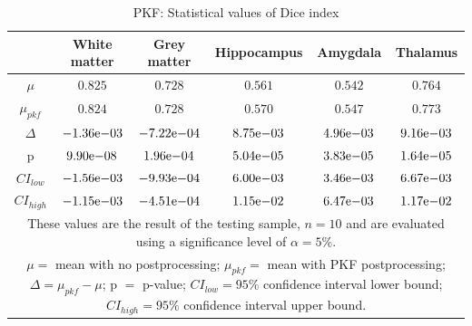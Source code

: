 \documentclass[journal]{IEEEtran}
\begin{document}
\begin{table}[ht]
\renewcommand{\arraystretch}{1.4}
\caption{PKF: Statistical values of Dice index}
\label{tbl_pkf_dice}
\centering
\begin{tabular}{c|c|c|c|c|c}
\hline
  & White matter & Grey matter & Hippocampus & Amygdala & Thalamus\\
\hline
$\mu$&$0.825$&$0.728$&$0.561$&$0.542$&$0.764$\\
$\mu_{pkf}$&$0.824$&$0.728$&$0.570$&$0.547$&$0.773$\\
$\Delta$&${-1.36}\mathrm{e}{-03}$&${-7.22}\mathrm{e}{-04}$&${8.75}\mathrm{e}{-03}$&${4.96}\mathrm{e}{-03}$&$9{.16}\mathrm{e}{-03}$\\
p&$	{9.90}\mathrm{e}{-08}$&${1.96}\mathrm{e}{-04}$&${5.04}\mathrm{e}{-05}$&$	{3.83}\mathrm{e}{-05}$&${1.64}\mathrm{e}{-05}$\\
$CI_{low}$&${-1.56}\mathrm{e}{-03}$&${-9.93}\mathrm{e}{-04}$&${6.00}\mathrm{e}{-03}$&$	{3.46}\mathrm{e}{-03}$&${6.67}\mathrm{e}{-03}$\\
$CI_{high}$&$	{-1.15}\mathrm{e}{-03}$&${-4.51}\mathrm{e}{-04}$&${1.15}\mathrm{e}{-02}$&$	{6.47}\mathrm{e}{-03}$&${1.17}\mathrm{e}{-02}$\\
\hline
\multicolumn{6}{p{\textwidth}}{These values are the result of the testing sample, $n=10$ and are evaluated using a significance level of $\alpha = 5\%$. }\\
\multicolumn{6}{p{\textwidth}}{$\mu=$ mean with no postprocessing; $\mu_{pkf}=$ mean with PKF postprocessing; $\Delta=\mu_{pkf}-\mu$; p $=$ p-value;  $CI_{low}= 95\%$ confidence interval lower bound; $CI_{high}= 95\%$ confidence interval upper bound.}\\

\end{tabular}
\end{table}
\end{document}
